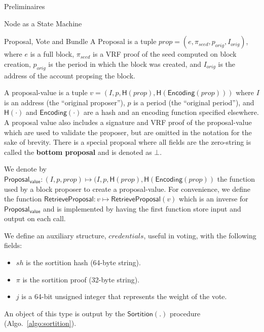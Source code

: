 \documentclass[10pt,a4paper]{article}
\begin{document}
\begin{section}{Preliminaires}
\begin{subsection}{Node as a State Machine}

\end{subsection}
\begin{subsection}{Proposal, Vote and Bundle}\label{sect:proposal-vote-bundle}
A Proposal is a tuple $prop = (e, \pi_{seed}, p_{orig}, I_{orig})$, where
$e$ is a full block, $\pi_{seed}$ is a VRF proof of the seed computed
on block creation, $p_{orig}$ is the period in which the block was created,
and $I_{orig}$ is the address of the account propsing the block.

A proposal-value is a tuple $v = (I, p, \mathsf{H}(prop), \mathsf{H}(\mathsf{Encoding}(prop)))$ where 
$I$ is an address (the ``original proposer''), 
$p$ is a period (the ``original period''), 
and 
$\mathsf{H}(\cdot)$ and $\mathsf{Encoding}(\cdot)$ are a hash and an encoding 
function specified elsewhere. 
A proposal value also includes a signature and VRF proof of the proposal-value 
  which are used to validate the proposer, but are omitted in the notation for
  the sake of brevity.
There is a special proposal where all fields are the zero-string is called the {\bf bottom 
proposal} and is denoted as $\bot$.

We denote by $\mathsf{Proposal_{value}}:(I, p, prop)\mapsto(I, p, \mathsf{H}(prop), \mathsf{H}(\mathsf{Encoding}(prop))$ 
the function used by a block proposer to create a proposal-value.
For convenience, we define the function $\mathsf{RetrieveProposal}:v\mapsto{\mathsf{RetrieveProposal}}(v)$ 
which is an inverse for $\mathsf{Proposal_{value}}$ and is implemented by having
the first function store input and output on each call.

We define an auxiliary structure, $credentials$, useful in voting, with the following fields:
\begin{itemize}
    \item $sh$ is the sortition hash (64-byte string).
    \item $\pi$ is the sortition proof (32-byte string).
    \item $j$ is a 64-bit unsigned integer that represents the weight of the vote.
\end{itemize}
An object of this type is output by the $\mathsf{Sortition}(.)$ procedure (Algo.~\ref{algo:sortition}).


\end{subsection}
\end{section}
\end{document}
